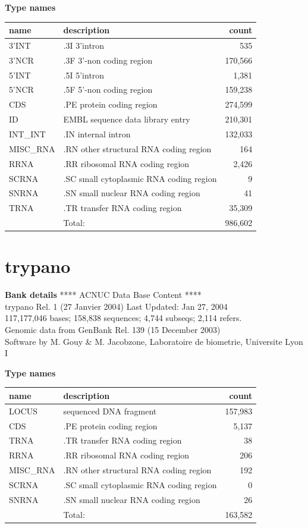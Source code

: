\documentclass{article}
\begin{document}
\begin{Schunk}
\textbf{Type names}
\noindent\begin{tabular}{llr}
\hline \hline
name & description & count \\
\hline
3'INT  &  .3I 3'intron  &  535 \\
3'NCR  &  .3F  3'-non coding region  &  170,566 \\
5'INT  &  .5I 5'intron  &  1,381 \\
5'NCR  &  .5F  5'-non coding region  &  159,238 \\
CDS  &  .PE protein coding region  &  274,599 \\
ID  &  EMBL sequence data library entry  &  210,301 \\
INT\_INT  &  .IN  internal intron  &  132,033 \\
MISC\_RNA  &  .RN other structural RNA coding region  &  164 \\
RRNA  &  .RR ribosomal RNA coding region  &  2,426 \\
SCRNA  &  .SC small cytoplasmic RNA coding region  &  9 \\
SNRNA  &  .SN small nuclear RNA coding region  &  41 \\
TRNA  &  .TR transfer RNA coding region  &  35,309 \\
\hline
 & Total: & 986,602 \\
\hline \hline
\end{tabular}

\section{ trypano }
\textbf{Bank details}
             ****     ACNUC Data Base Content      ****                         \\
         trypano Rel. 1 (27 Janvier 2004) Last Updated: Jan 27, 2004\\
117,177,046 bases; 158,838 sequences; 4,744 subseqs; 2,114 refers.\\
	Genomic data from GenBank Rel. 139 (15 December 2003)\\
Software by M. Gouy \& M. Jacobzone, Laboratoire de biometrie, Universite Lyon I 

\textbf{Type names}
\noindent\begin{tabular}{llr}
\hline \hline
name & description & count \\
\hline
LOCUS  &  sequenced DNA fragment  &  157,983 \\
CDS  &  .PE protein coding region  &  5,137 \\
TRNA  &  .TR transfer RNA coding region  &  38 \\
RRNA  &  .RR ribosomal RNA coding region  &  206 \\
MISC\_RNA  &  .RN other structural RNA coding region  &  192 \\
SCRNA  &  .SC small cytoplasmic RNA coding region  &  0 \\
SNRNA  &  .SN small nuclear RNA coding region  &  26 \\
\hline
 & Total: & 163,582 \\
\hline \hline
\end{tabular}


\end{Schunk}
\end{document}
